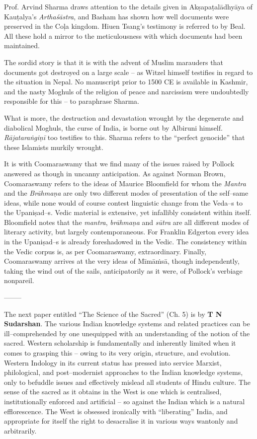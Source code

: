 Prof. Arvind Sharma draws attention to the details given in Akṣapaṭalādhyāya of Kauṭalya’s \textit{Arthaśāstra}, and Basham has shown how well documents were preserved in the Coḷa kingdom. Hiuen Tsang’s testimony is referred to by Beal. All these hold a mirror to the meticulousness with which documents had been maintained. 

The sordid story is that it is with the advent of Muslim marauders that documents got destroyed on a large scale – as Witzel himself testifies in regard to the situation in Nepal. No manuscript prior to 1500 CE is available in Kashmir, and the nasty Moghuls of the religion of peace and narcissism were undoubtedly responsible for this – to paraphrase Sharma.

What is more, the destruction and devastation wrought by the degenerate and diabolical Moghuls, the curse of India, is borne out by Albiruni himself. \textit{Rājataraṅgiṇī} too testifies to this. Sharma refers to the “perfect genocide” that these Islamists murkily wrought.

It is with Coomaraswamy that we find many of the issues raised by Pollock answered as though in uncanny anticipation. As against Norman Brown, Coomaraswamy refers to the ideas of Maurice Bloomfield for whom the \textit{Mantra} and the \textit{Brāhmaṇa} are only two different modes of presentation of the self–same ideas, while none would of course contest linguistic change from the Veda–s to the Upaniṣad–s. Vedic material is extensive, yet infallibly consistent within itself. Bloomfield notes that the \textit{mantra}, \textit{brāhmaṇa} and \textit{sūtra} are all different modes of literary activity, but largely contemporaneous. For Franklin Edgerton every idea in the Upaniṣad–s is already foreshadowed in the Vedic. The consistency within the Vedic corpus is, as per Coomaraswamy, extraordinary. Finally, Coomaraswamy arrives at the very ideas of Mīmāṁsā, though independently, taking the wind out of the sails, anticipatorily as it were, of Pollock's verbiage nonpareil. 

–––––

The next paper entitled “The Science of the Sacred” (Ch. 5) is by \textbf{T N Sudarshan}. The various Indian knowledge systems and related practices can be ill–comprehended by one unequipped with an understanding of the notion of the sacred. Western scholarship is fundamentally and inherently limited when it comes to grasping this – owing to its very origin, structure, and evolution. Western Indology in its current status has pressed into service Marxist, philological, and post–modernist approaches to the Indian knowledge systems, only to befuddle issues and effectively mislead all students of Hindu culture. The sense of the sacred as it obtains in the West is one which is centralised, institutionally enforced and artificial – so against the Indian which is a natural efflorescence. The West is obsessed ironically with “liberating” India, and appropriate for itself the right to desacralise it in various ways wantonly and arbitrarily.

